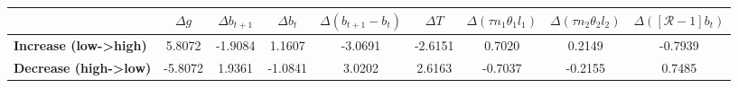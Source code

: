 \begin{tiny}\begin{tabular}{|l|c|c|c|c|c|c|c|c|}
\hline
&\textbf{$\Delta g$}&\textbf{$\Delta b_{t+1}$}&\textbf{$\Delta b_{t}$}&\textbf{$\Delta (b_{t+1}-b_{t})$}&\textbf{$\Delta T$}&\textbf{$\Delta (\tau n_1\theta_1 l_1 )$}&\textbf{$\Delta (\tau n_2\theta_2 l_2)$}&\textbf{$\Delta ([\mathcal{R}-1]b_t)$}\\\hline
\textbf{Increase (low->high)}&5.8072&-1.9084&1.1607&-3.0691&-2.6151&0.7020&0.2149&-0.7939\\\hline
\textbf{Decrease (high->low)}&-5.8072&1.9361&-1.0841&3.0202&2.6163&-0.7037&-0.2155&0.7485\\\hline
\end{tabular}
\end{tiny}